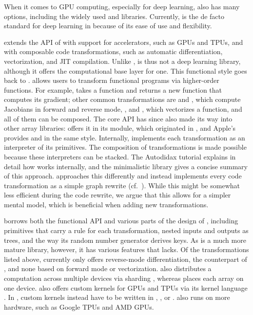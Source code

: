 \documentclass[article,shortnames]{jss}
\begin{document}
When it comes to GPU computing, especially for deep learning,  also has many options, including the widely used  \citep{ref-abadi2016tensorflow} and  \citep{ref-pytorch} libraries.
Currently,  is the de facto standard for deep learning in  because of its ease of use and flexibility.

 \citep{ref-jax} extends the API of  with support for accelerators, such as GPUs and TPUs, and with composable code transformations, such as automatic differentiation, vectorization, and JIT compilation.
Unlike ,  is thus not a deep learning library, although it offers the computational base layer for one.
This functional style goes back to  \citep{ref-autograd}.
 allows users to transform functional programs via higher-order functions.
For example,  takes a function and returns a new function that computes its gradient; other common transformations are  and , which compute Jacobians in forward and reverse mode, , and , which vectorizes a function, and all of them can be composed.
The core API has since also made its way into other array libraries:  offers it in its  module, which originated in  \citep{ref-functorch}, and Apple's  \citep{ref-mlx} provides  and  in the same style.
Internally,  implements each transformation as an interpreter of its primitives.
The composition of transformations is made possible because these interpreters can be stacked.
The Autodidax tutorial \citep{ref-autodidax} explains in detail how  works internally, and the minimalistic  library  \citep{ref-microjax} gives a concise summary of this approach.
 approaches this differently and instead implements every code transformation as a simple graph rewrite (cf.~).
While this might be somewhat less efficient during the code rewrite, we argue that this allows for a simpler mental model, which is beneficial when adding new transformations.

 borrows both the functional API and various parts of the design of , including primitives that carry a rule for each transformation, nested inputs and outputs as trees, and the way its random number generator derives keys.
As  is a much more mature library, however, it has various features that  lacks.
Of the transformations listed above,  currently only offers reverse-mode differentiation, the counterpart of , and none based on forward mode or vectorization.
 also distributes a computation across multiple devices via sharding \citep{ref-gspmd}, whereas  places each array on one device.
 also offers custom kernels for GPUs and TPUs via its kernel language  \citep{ref-pallas}.
In , custom kernels instead have to be written in , , or .
 also runs on more hardware, such as Google TPUs and AMD GPUs.
\end{document}
